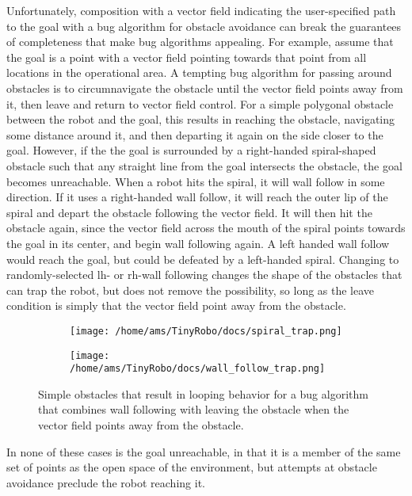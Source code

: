 Unfortunately, composition with a vector field indicating the user-specified path to the goal with a bug algorithm for obstacle avoidance can break the guarantees of completeness that make bug algorithms appealing. 
For example, assume that the goal is a point with a vector field pointing towards that point from all locations in the operational area. 
A tempting bug algorithm for passing around obstacles is to circumnavigate the obstacle until the vector field points away from it, then leave and return to vector field control. 
For a simple polygonal obstacle between the robot and the goal, this results in reaching the obstacle, navigating some distance around it, and then departing it again on the side closer to the goal. 
However, if the the goal is surrounded by a right-handed spiral-shaped obstacle such that any straight line from the goal intersects the obstacle, the goal becomes unreachable. 
When a robot hits the spiral, it will wall follow in some direction.
If it uses a right-handed wall follow, it will reach the outer lip of the spiral and depart the obstacle following the vector field. It will then hit the obstacle again, since the vector field across the mouth of the spiral points towards the goal in its center, and begin wall following again. 
A left handed wall follow would reach the goal, but could be defeated by a left-handed spiral. 
Changing to randomly-selected lh- or rh-wall following changes the shape of the obstacles that can trap the robot, but does not remove the possibility, so long as the leave condition is simply that the vector field point away from the obstacle. 

\begin{figure}
	\centering
	\begin{subfigure}{0.45\textwidth}
		\texttt{[image: /home/ams/TinyRobo/docs/spiral\_trap.png]}
	\end{subfigure}
	\begin{subfigure}{0.45\textwidth}
		\texttt{[image: /home/ams/TinyRobo/docs/wall\_follow\_trap.png]}
	\end{subfigure}
	\caption{Simple obstacles that result in looping behavior for a bug algorithm that combines wall following with leaving the obstacle when the vector field points away from the obstacle.}
	\label{traps_for_wall_follow}
\end{figure}

In none of these cases is the goal unreachable, in that it is a member of the same set of points as the open space of the environment, but attempts at obstacle avoidance preclude the robot reaching it. 

